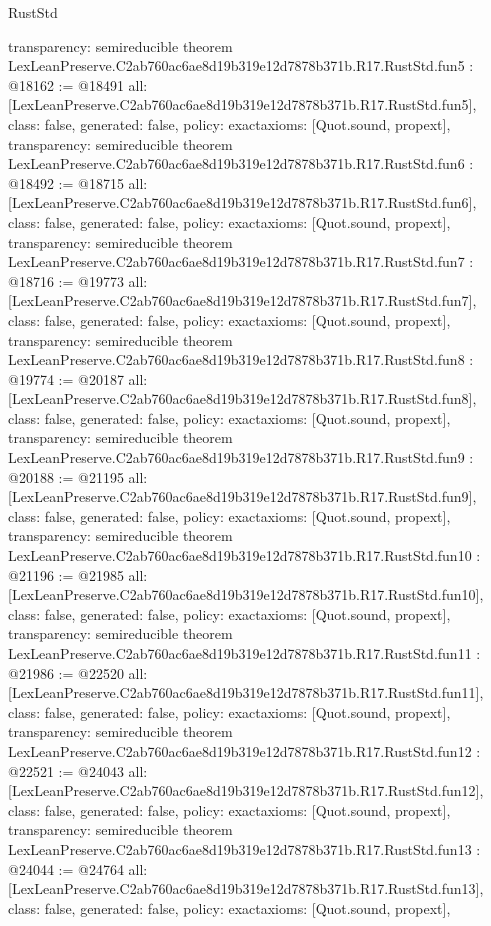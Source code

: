 \begin{lexlean}{RustStd}
\begin{coremodule}
{  transparency: semireducible
}
theorem LexLeanPreserve.C2ab760ac6ae8d19b319e12d7878b371b.R17.RustStd.fun5 : @18162 := @18491 {
  all: [LexLeanPreserve.C2ab760ac6ae8d19b319e12d7878b371b.R17.RustStd.fun5],
  class: false,
  generated: false,
  policy: exact{axioms: [Quot.sound, propext]},
  transparency: semireducible
}
theorem LexLeanPreserve.C2ab760ac6ae8d19b319e12d7878b371b.R17.RustStd.fun6 : @18492 := @18715 {
  all: [LexLeanPreserve.C2ab760ac6ae8d19b319e12d7878b371b.R17.RustStd.fun6],
  class: false,
  generated: false,
  policy: exact{axioms: [Quot.sound, propext]},
  transparency: semireducible
}
theorem LexLeanPreserve.C2ab760ac6ae8d19b319e12d7878b371b.R17.RustStd.fun7 : @18716 := @19773 {
  all: [LexLeanPreserve.C2ab760ac6ae8d19b319e12d7878b371b.R17.RustStd.fun7],
  class: false,
  generated: false,
  policy: exact{axioms: [Quot.sound, propext]},
  transparency: semireducible
}
theorem LexLeanPreserve.C2ab760ac6ae8d19b319e12d7878b371b.R17.RustStd.fun8 : @19774 := @20187 {
  all: [LexLeanPreserve.C2ab760ac6ae8d19b319e12d7878b371b.R17.RustStd.fun8],
  class: false,
  generated: false,
  policy: exact{axioms: [Quot.sound, propext]},
  transparency: semireducible
}
theorem LexLeanPreserve.C2ab760ac6ae8d19b319e12d7878b371b.R17.RustStd.fun9 : @20188 := @21195 {
  all: [LexLeanPreserve.C2ab760ac6ae8d19b319e12d7878b371b.R17.RustStd.fun9],
  class: false,
  generated: false,
  policy: exact{axioms: [Quot.sound, propext]},
  transparency: semireducible
}
theorem LexLeanPreserve.C2ab760ac6ae8d19b319e12d7878b371b.R17.RustStd.fun10 : @21196 := @21985 {
  all: [LexLeanPreserve.C2ab760ac6ae8d19b319e12d7878b371b.R17.RustStd.fun10],
  class: false,
  generated: false,
  policy: exact{axioms: [Quot.sound, propext]},
  transparency: semireducible
}
theorem LexLeanPreserve.C2ab760ac6ae8d19b319e12d7878b371b.R17.RustStd.fun11 : @21986 := @22520 {
  all: [LexLeanPreserve.C2ab760ac6ae8d19b319e12d7878b371b.R17.RustStd.fun11],
  class: false,
  generated: false,
  policy: exact{axioms: [Quot.sound, propext]},
  transparency: semireducible
}
theorem LexLeanPreserve.C2ab760ac6ae8d19b319e12d7878b371b.R17.RustStd.fun12 : @22521 := @24043 {
  all: [LexLeanPreserve.C2ab760ac6ae8d19b319e12d7878b371b.R17.RustStd.fun12],
  class: false,
  generated: false,
  policy: exact{axioms: [Quot.sound, propext]},
  transparency: semireducible
}
theorem LexLeanPreserve.C2ab760ac6ae8d19b319e12d7878b371b.R17.RustStd.fun13 : @24044 := @24764 {
  all: [LexLeanPreserve.C2ab760ac6ae8d19b319e12d7878b371b.R17.RustStd.fun13],
  class: false,
  generated: false,
  policy: exact{axioms: [Quot.sound, propext]},
}
\end{coremodule}
\end{lexlean}
